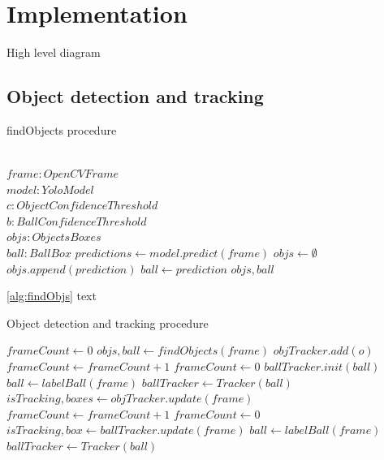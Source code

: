 \documentclass[
    11pt,
    oneside
]{report}
\begin{document}
\chapter{Implementation}



High level diagram






\section{Object detection and tracking}


\begin{algorithm}[H]
\begin{algorithmic}
\caption{findObjects procedure}\label{alg:findObjs}
\Require \\
    $frame: OpenCVFrame$ \\
    $model: YoloModel$ \\
    $c: ObjectConfidenceThreshold$ \\
    $b: BallConfidenceThreshold$
\Ensure \\
    $objs: ObjectsBoxes$ \\
    $ball: BallBox$
\State
\State $predictions \gets model.predict(frame)$
\State $objs \gets \emptyset$
        \State $objs.append(prediction)$
    \EndIf
        \State $ball \gets prediction$
    \EndIf
\EndFor
\State
\Return $objs, ball$
\end{algorithmic}
\end{algorithm}


\ref{alg:findObjs} text


\begin{algorithm}[H]
\begin{algorithmic}
\caption{Object detection and tracking procedure}\label{alg:detect_tracking}
\State $frameCount \gets 0$
        \State $objs, ball \gets findObjects(frame)$
                \State $objTracker.add(o)$
            \EndFor
            \State $frameCount \gets frameCount + 1$
        \Else
            \State $frameCount \gets 0$
        \EndIf
            \State $ballTracker.init(ball)$
        \Else
            \State $ball \gets labelBall(frame)$
            \State $ballTracker \gets Tracker(ball)$
        \EndIf
    \Else
        \State $isTracking, boxes \gets objTracker.update(frame)$
            \State $frameCount \gets frameCount + 1$
        \Else
            \State $frameCount \gets 0$
        \EndIf
        \State $isTracking, box \gets ballTracker.update(frame)$
            \State $ball \gets labelBall(frame)$
            \State $ballTracker \gets Tracker(ball)$
        \EndIf
    \EndIf
\EndFor
\end{algorithmic}
\end{algorithm}
\end{document}
